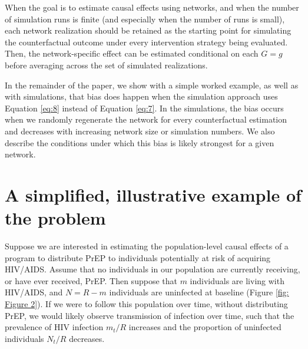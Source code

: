 \documentclass{article}
\theoremstyle{definition}
\begin{document}
When the goal is to estimate causal effects using networks, and when the number of simulation runs is finite (and especially when the number of runs is small), each network realization should be retained as the starting point for simulating the counterfactual outcome under every intervention strategy being evaluated. Then, the network-specific effect can be estimated conditional on each $G=g$ before averaging across the set of simulated realizations. 

In the remainder of the paper, we show with a simple worked example, as well as with simulations, that bias does happen when the simulation approach uses Equation \ref{eq:8} instead of Equation \ref{eq:7}. In the simulations, the bias occurs when we randomly regenerate the network for every counterfactual estimation and decreases with increasing network size or simulation numbers. We also describe the conditions under which this bias is likely strongest for a given network.

\section{A simplified, illustrative example of the problem}
Suppose we are interested in estimating the population-level causal effects of a program to distribute PrEP to individuals potentially at risk of acquiring HIV/AIDS. Assume that no individuals in our population are currently receiving, or have ever received, PrEP. Then suppose that $m$ individuals are living with HIV/AIDS, and $N = R-m$ individuals are uninfected at baseline (Figure \ref{fig: Figure 2}). If we were to follow this population over time, without distributing PrEP, we would likely observe transmission of infection over time, such that the prevalence of HIV infection $m_t/R$ increases and the proportion of uninfected individuals $N_t/R$ decreases. 
\end{document}
